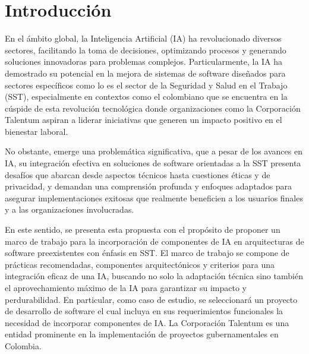 \section{Introducción}

En el ámbito global, la Inteligencia Artificial (IA) ha revolucionado diversos sectores, facilitando la toma de decisiones, optimizando procesos y generando soluciones innovadoras para problemas complejos. Particularmente, la IA ha demostrado su potencial en la mejora de sistemas de software diseñados para sectores específicos como lo es el sector de la Seguridad y Salud en el Trabajo (SST), especialmente en contextos como el colombiano que se encuentra en la cúspide de esta revolución tecnológica donde organizaciones como la Corporación Talentum aspiran a liderar iniciativas que generen un impacto positivo en el bienestar laboral.

No obstante, emerge una problemática significativa, que a pesar de los avances en IA, su integración efectiva en soluciones de software orientadas a la SST presenta desafíos que abarcan desde aspectos técnicos hasta cuestiones éticas y de privacidad, y demandan una comprensión profunda y enfoques adaptados para asegurar implementaciones exitosas que realmente beneficien a los usuarios finales y a las organizaciones involucradas.


En este sentido, se presenta esta propuesta con el propósito de proponer un marco de trabajo para la incorporación de componentes de IA en arquitecturas de software preexistentes con énfasis en SST. El marco de trabajo se compone de prácticas recomendadas, componentes arquitectónicos y criterios para una integración eficaz de una IA, buscando no solo la adaptación técnica sino también el aprovechamiento máximo de la IA para garantizar su impacto y perdurabilidad. En particular, como caso de estudio, se seleccionará un proyecto de desarrollo de software el cual incluya en sus requerimientos funcionales la necesidad de incorporar componentes de IA. La Corporación Talentum es una entidad prominente en la implementación de proyectos gubernamentales en Colombia.

